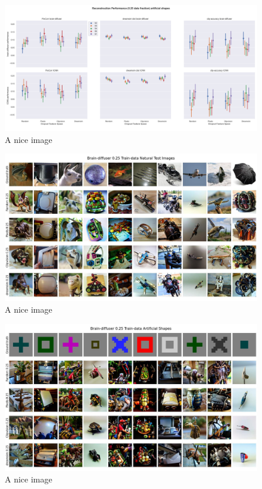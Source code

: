 \begin{figure}[ht]
    \centering
    \includegraphics[width=1\textwidth]{plots/dropout_eval_reconstruction_art.png}
    \caption{A nice image}\label{fig:dropout_eval_reconstruction_art}
\end{figure}

\begin{figure}[ht]
    \centering
    \includegraphics[width=1\textwidth]{plots/dropout_qual_eval_bd_test.JPEG}
    \caption{A nice image}\label{fig:dropout_qual_eval_bd_test}
\end{figure}

\begin{figure}[ht]
    \centering
    \includegraphics[width=1\textwidth]{plots/dropout_qual_eval_bd_art.JPEG}
    \caption{A nice image}\label{fig:dropout_qual_eval_bd_art}
\end{figure}

